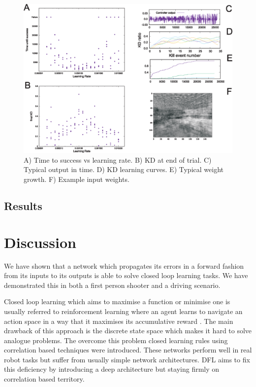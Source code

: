 \documentclass{llncs}
\begin{document}
\begin{figure}[h!]
	\centering
	\includegraphics[width=\columnwidth]{FPSFig2}
	\caption{A) Time to success vs learning rate. B) KD at end of trial. C) Typical output in time. D) KD learning curves. E) Typical weight growth. F) Example input weights.
		\label{shooter_results}}
\end{figure}



\subsection{Results}


\section{Discussion}
We have shown that a network which propagates its errors in a forward
fashion from its inputs to its outputs is able to solve closed loop
learning tasks. We have demonstrated this in both a first person
shooter and a driving scenario.

Closed loop learning which aims to maximise a function or minimise one
is usually referred to reinforcement learning where an agent learns to
navigate an action space in a way that it maximises its accumulative
reward \cite{Dayan1992}. The main drawback of this approach
is the discrete state space which makes it hard to solve analogue
problems. The overcome this problem closed learning rules using
correlation based techniques \cite{Verschure98summary} were introduced.
These networks perform well in real robot tasks but suffer from
usually simple network architectures. DFL aims to fix this
deficiency by introducing a deep architecture but staying firmly
on correlation based territory.
\end{document}
